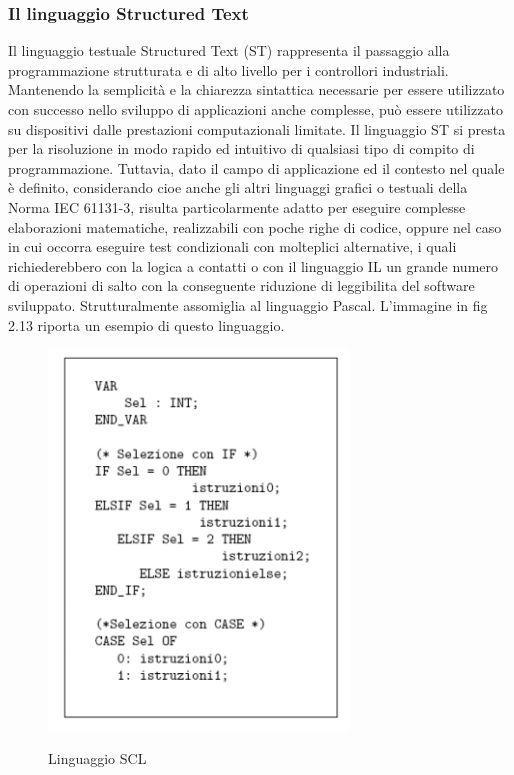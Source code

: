 \documentclass[12pt, a4paper, oneside]{book}
\begin{document}
\subsubsection{Il linguaggio Structured Text}
Il linguaggio testuale Structured Text (ST) rappresenta il passaggio alla programmazione strutturata e di alto livello per i controllori industriali. Mantenendo la semplicità e la chiarezza sintattica necessarie per essere utilizzato con successo nello sviluppo di applicazioni anche complesse, può essere utilizzato su dispositivi dalle prestazioni computazionali limitate. Il linguaggio ST si presta per la risoluzione in modo rapido ed intuitivo di qualsiasi tipo di compito di programmazione. Tuttavia, dato il campo di applicazione ed il contesto nel quale è definito, considerando cioe anche gli altri linguaggi grafici o testuali della Norma IEC 61131-3, risulta particolarmente adatto per eseguire complesse elaborazioni matematiche, realizzabili con poche righe di codice, oppure nel caso in cui occorra eseguire test condizionali con molteplici alternative, i quali richiederebbero con la logica a contatti o con il linguaggio IL un grande numero di operazioni di salto con la conseguente riduzione di leggibilita del software sviluppato. Strutturalmente assomiglia al linguaggio Pascal. L'immagine in fig 2.13 riporta un esempio di questo linguaggio.

	\begin{figure}[H]
	\centering
	\includegraphics[width=8cm]{Immagini/SCL}
	\label{scl}
	\caption{Linguaggio SCL}
\end{figure}
\end{document}
